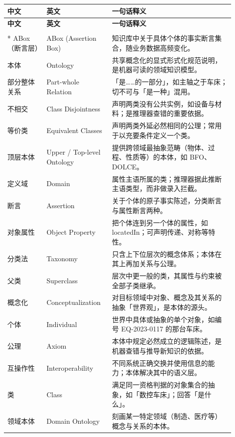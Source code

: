 \begin{longtable}{@{}p{0.16\linewidth}p{0.26\linewidth}p{0.5\linewidth}@{}}
\toprule \textbf{中文} & \textbf{英文} & \textbf{一句话释义} \\ \midrule \endfirsthead
\toprule \textbf{中文} & \textbf{英文} & \textbf{一句话释义} \\ \midrule \endhead
\bottomrule \endlastfoot
\multicolumn{3}{@{}l}{\textbf{——基础概念——}} \\*
\addlinespace[3pt]
ABox（断言层） & ABox (Assertion Box) & 知识库中关于具体个体的事实断言集合，随业务数据高频变化。 \\
本体 & Ontology & 共享概念化的显式形式化规范说明，是机器可读的领域知识模型。 \\
部分整体关系 & Part-whole Relation & 「是……的一部分」，如主轴之于车床；切不可与「是一种」混用。 \\
不相交 & Class Disjointness & 声明两类没有公共实例，如设备与材料；是推理器查错的重要依据。 \\
等价类 & Equivalent Classes & 声明两类外延必然相同的公理；常用于以充要条件定义一个类。 \\
顶层本体 & Upper / Top-level Ontology & 提供跨领域最抽象范畴（物体、过程、性质等）的本体，如 BFO、DOLCE。 \\
定义域 & Domain & 属性主语所属的类；推理器据此推断主语类型，而非做录入拦截。 \\
断言 & Assertion & 关于个体的原子事实陈述，分类断言与属性断言两种。 \\
对象属性 & Object Property & 把个体连到另一个体的属性，如 locatedIn；可声明传递、对称等特性。 \\
分类法 & Taxonomy & 只含上下位层次的概念体系；本体在其上再加关系与公理。 \\
父类 & Superclass & 层次中更一般的类，其属性与约束被全部子类继承。 \\
概念化 & Conceptualization & 对目标领域中对象、概念及其关系的抽象「世界观」，是本体的源头。 \\
个体 & Individual & 世界中具体或抽象的单个对象，如编号 EQ-2023-0117 的那台车床。 \\
公理 & Axiom & 本体中规定必然成立的逻辑陈述，是机器查错与推导新知识的依据。 \\
互操作性 & Interoperability & 不同系统正确交换并使用信息的能力；本体解决其中的语义层。 \\
类 & Class & 满足同一资格判据的对象集合的抽象，如「数控车床」；回答「是什么」。 \\
领域本体 & Domain Ontology & 刻画某一特定领域（制造、医疗等）概念与关系的本体。 \\

\end{longtable}
